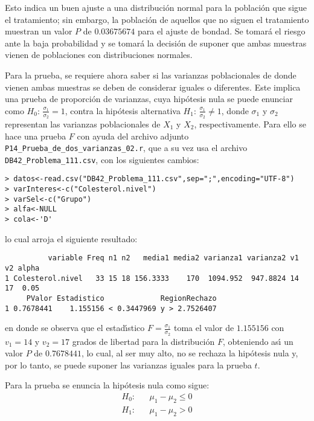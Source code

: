 \begin{solucion}
 \vspace{-0.5cm}
 Esto indica un buen ajuste a una distribuci\'on normal
 para la poblaci\'on que sigue el tratamiento;
 sin embargo, la poblaci\'on de aquellos que no siguen el tratamiento
 muestran un valor $P$ de $0.03675674$ para el ajuste de bondad.
 Se tomar\'a el riesgo ante la baja probabilidad
 y se tomar\'a la decisi\'on de suponer que ambas muestras vienen
 de poblaciones con distribuciones normales.
 \par
 Para la prueba, se requiere ahora saber si las varianzas poblacionales
 de donde vienen ambas muestras se deben de considerar iguales
 o diferentes. Este implica una prueba de proporci\'on de varianzas,
 cuya hip\'otesis nula se puede enunciar como
 $H_0: \, \frac{\sigma_1}{\sigma_2} = 1$, contra la hip\'otesis
 alternativa $H_1: \, \frac{\sigma_1}{\sigma_2} \neq 1$,
 donde $\sigma_1$ y $\sigma_2$ representan las varianzas poblacionales
 de $X_1$ y $X_2$, respectivamente.
 Para ello se hace una prueba $F$ con ayuda del archivo adjunto
 \texttt{P14\_Prueba\_de\_dos\_varianzas\_02.r},
 que a su vez usa el archivo \texttt{DB42\_Problema\_111.csv},
 con los siguientes cambios:
 \begin{verbatim}
> datos<-read.csv("DB42_Problema_111.csv",sep=";",encoding="UTF-8")
> varInteres<-c("Colesterol.nivel")
> varSel<-c("Grupo")
> alfa<-NULL
> cola<-'D'
 \end{verbatim}
 \vspace{-0.5cm}
 lo cual arroja el siguiente resultado:
 \begin{verbatim}
          variable Freq n1 n2   media1 media2 varianza1 varianza2 v1 v2 alpha
1 Colesterol.nivel   33 15 18 156.3333    170  1094.952  947.8824 14 17  0.05
     PValor Estadistico             RegionRechazo
1 0.7678441    1.155156 < 0.3447969 y > 2.7526407
 \end{verbatim}
 \vspace{-0.5cm}
 en donde se observa que el estad\'{\i}stico $F=\frac{\sigma_1}{\sigma_2}$
 toma el valor de $1.155156$ con $v_1 = 14$ y $v_2 = 17$ grados
 de libertad para la distribuci\'on $F$,
 obteniendo as\'{\i} un valor $P$ de $0.7678441$,
 lo cual, al ser muy alto, no se rechaza la hip\'otesis nula y,
 por lo tanto, se puede suponer las varianzas iguales para la prueba $t$.
 \par 
 Para la prueba se enuncia la hip\'otesis nula como sigue:
 \begin{eqnarray*}
  H_0: & & \mu_1 - \mu_2 \leq 0 \\
  H_1: & & \mu_1 - \mu_2   >  0

\end{eqnarray*}
\end{solucion}
